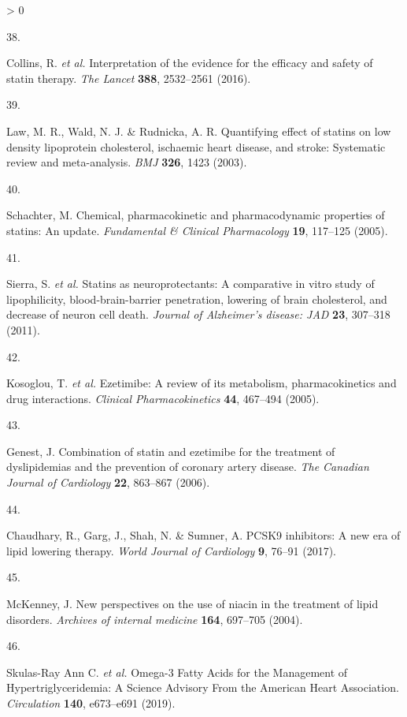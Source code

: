 \documentclass[a4paper, twoside]{templates/ociamthesis}
\newlength{\cslhangindent}
\newlength{\csllabelwidth}
\newenvironment{CSLReferences}[3] %
 {%
  \setlength{\parindent}{0pt}
  \ifodd #1 \everypar{\setlength{\hangindent}{\cslhangindent}}\ignorespaces\fi
  \ifnum #2 > 0
  \setlength{\parskip}{#2\baselineskip}
  \fi
 }%
 {}
\newcommand{\CSLLeftMargin}[1]{\parbox[t]{\maxof{\widthof{#1}}{\csllabelwidth}}{#1}}
\newcommand{\CSLRightInline}[1]{\parbox[t]{\linewidth - \csllabelwidth}{#1}}
\begin{document}
\begin{CSLReferences}{0}{0}
\leavevmode\hypertarget{ref-collins2016}{}%
\CSLLeftMargin{38. }
\CSLRightInline{Collins, R. \emph{et al.} Interpretation of the evidence for the efficacy and safety of statin therapy. \emph{The Lancet} \textbf{388}, 2532--2561 (2016).}

\leavevmode\hypertarget{ref-law2003}{}%
\CSLLeftMargin{39. }
\CSLRightInline{Law, M. R., Wald, N. J. \& Rudnicka, A. R. Quantifying effect of statins on low density lipoprotein cholesterol, ischaemic heart disease, and stroke: Systematic review and meta-analysis. \emph{BMJ} \textbf{326}, 1423 (2003).}

\leavevmode\hypertarget{ref-schachter2005}{}%
\CSLLeftMargin{40. }
\CSLRightInline{Schachter, M. Chemical, pharmacokinetic and pharmacodynamic properties of statins: An update. \emph{Fundamental \& Clinical Pharmacology} \textbf{19}, 117--125 (2005).}

\leavevmode\hypertarget{ref-sierra2011}{}%
\CSLLeftMargin{41. }
\CSLRightInline{Sierra, S. \emph{et al.} Statins as neuroprotectants: A comparative in vitro study of lipophilicity, blood-brain-barrier penetration, lowering of brain cholesterol, and decrease of neuron cell death. \emph{Journal of Alzheimer's disease: JAD} \textbf{23}, 307--318 (2011).}

\leavevmode\hypertarget{ref-kosoglou2005}{}%
\CSLLeftMargin{42. }
\CSLRightInline{Kosoglou, T. \emph{et al.} Ezetimibe: A review of its metabolism, pharmacokinetics and drug interactions. \emph{Clinical Pharmacokinetics} \textbf{44}, 467--494 (2005).}

\leavevmode\hypertarget{ref-genest2006}{}%
\CSLLeftMargin{43. }
\CSLRightInline{Genest, J. Combination of statin and ezetimibe for the treatment of dyslipidemias and the prevention of coronary artery disease. \emph{The Canadian Journal of Cardiology} \textbf{22}, 863--867 (2006).}

\leavevmode\hypertarget{ref-chaudhary2017}{}%
\CSLLeftMargin{44. }
\CSLRightInline{Chaudhary, R., Garg, J., Shah, N. \& Sumner, A. {PCSK9} inhibitors: A new era of lipid lowering therapy. \emph{World Journal of Cardiology} \textbf{9}, 76--91 (2017).}

\leavevmode\hypertarget{ref-mckenney2004}{}%
\CSLLeftMargin{45. }
\CSLRightInline{McKenney, J. New perspectives on the use of niacin in the treatment of lipid disorders. \emph{Archives of internal medicine} \textbf{164}, 697--705 (2004).}

\leavevmode\hypertarget{ref-skulas2019}{}%
\CSLLeftMargin{46. }
\CSLRightInline{Skulas-Ray Ann C. \emph{et al.} Omega-3 {Fatty Acids} for the {Management} of {Hypertriglyceridemia}: A {Science Advisory From} the {American Heart Association}. \emph{Circulation} \textbf{140}, e673--e691 (2019).}


\end{CSLReferences}
\end{document}
